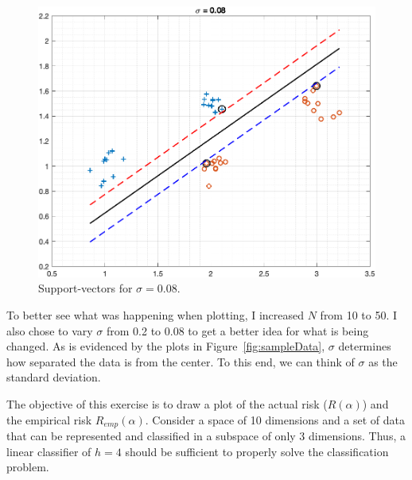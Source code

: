 \documentclass[11pt]{article}
\begin{document}
\begin{figure}[ht]
    \centering
    \includegraphics[width=\textwidth]{SVM_sig0.08.png}
    \vspace{-1em}\caption{Support-vectors for \( \sigma = 0.08\).}
    \label{fig:SVM-0.08}
\end{figure}

\begin{tcolorbox}[colback=CrispBlue!5!white,colframe=CrispBlue!75!black,title=Comments]
    To better see what was happening when plotting, I increased \(N\) from 10 to 50. I also chose to vary \( \sigma \) from 0.2 to 0.08 to get a better idea for what is being changed. As is evidenced by the plots in Figure~\ref{fig:sampleData}, \( \sigma \) determines how separated the data is from the center. To this end, we can think of \( \sigma \) as the standard deviation.
\end{tcolorbox}
\clearpage
\begin{tcolorbox}[colback=CrispBlue!5!white,colframe=CrispBlue!75!black,title=3.3 Estimating the structural risk.]
The objective of this exercise is to draw a plot of the actual risk ($R(\alpha )$) and the empirical risk $R_{emp} (\alpha )$. Consider a space of 10 dimensions and a set of data that can be represented and classified in a subspace of only 3 dimensions. Thus, a linear classifier of $h=4$ should be sufficient to properly solve the classification problem.
\end{tcolorbox}
\end{document}
